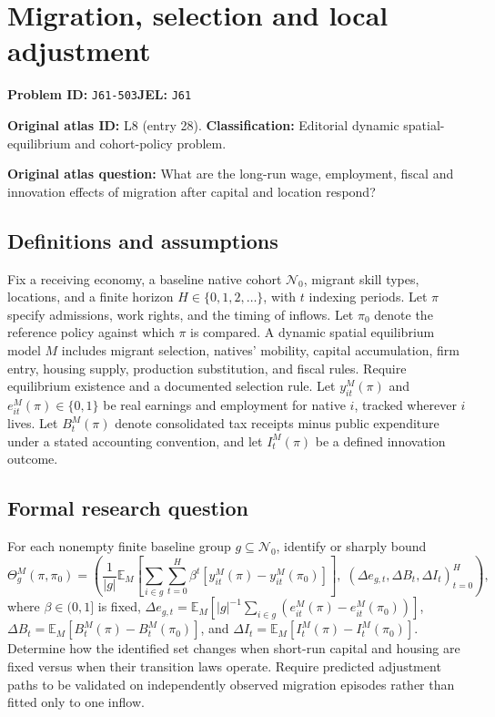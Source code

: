 \documentclass[11pt,a4paper]{article}
\begin{document}
\section*{Migration, selection and local adjustment}
\textbf{Problem ID:} \texttt{J61-503}\quad \textbf{JEL:} \texttt{J61}\par
\label{problem:OP-0028}
\label{atlas:prob:L8}
\noindent\textbf{Original atlas ID:} L8 (entry 28). \textbf{Classification:} Editorial dynamic spatial-equilibrium and cohort-policy problem.

\noindent\textbf{Original atlas question:} What are the long-run wage, employment, fiscal and innovation effects of migration after capital and location respond?

\subsection*{Definitions and assumptions}
Fix a receiving economy, a baseline native cohort $\mathcal N_0$, migrant skill types, locations, and a finite horizon $H\in\{0,1,2,\ldots\}$, with $t$ indexing periods. Let $\pi$ specify admissions, work rights, and the timing of inflows. Let $\pi_0$ denote the reference policy against which $\pi$ is compared. A dynamic spatial equilibrium model $M$ includes migrant selection, natives' mobility, capital accumulation, firm entry, housing supply, production substitution, and fiscal rules. Require equilibrium existence and a documented selection rule. Let $y_{it}^M(\pi)$ and $e_{it}^M(\pi)\in\{0,1\}$ be real earnings and employment for native $i$, tracked wherever $i$ lives. Let $B_t^M(\pi)$ denote consolidated tax receipts minus public expenditure under a stated accounting convention, and let $I_t^M(\pi)$ be a defined innovation outcome.
\subsection*{Formal research question}
For each nonempty finite baseline group $g\subseteq\mathcal N_0$, identify or sharply bound
\[
 \Theta_g^M(\pi,\pi_0)=\left(
 \frac1{|g|}\mathbb E_M\left[\sum_{i\in g}\sum_{t=0}^H\beta^t
      [y_{it}^M(\pi)-y_{it}^M(\pi_0)]\right],\;
 (\Delta e_{g,t},\Delta B_t,\Delta I_t)_{t=0}^H\right),
\]
where $\beta\in(0,1]$ is fixed, $\Delta e_{g,t}=\mathbb E_M[|g|^{-1}\sum_{i\in g}(e_{it}^M(\pi)-e_{it}^M(\pi_0))]$, $\Delta B_t=\mathbb E_M[B_t^M(\pi)-B_t^M(\pi_0)]$, and $\Delta I_t=\mathbb E_M[I_t^M(\pi)-I_t^M(\pi_0)]$. Determine how the identified set changes when short-run capital and housing are fixed versus when their transition laws operate. Require predicted adjustment paths to be validated on independently observed migration episodes rather than fitted only to one inflow.
\end{document}
